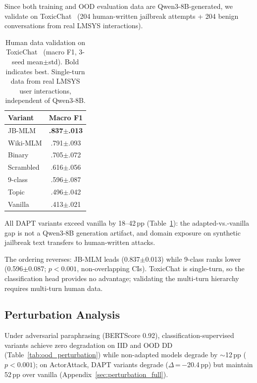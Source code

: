 Since both training and OOD evaluation data are Qwen3-8B-generated, we validate on ToxicChat~\citep{lin2023toxicchat} (204 human-written jailbreak attempts + 204 benign conversations from real LMSYS interactions).

\begin{table}[t]
\centering
\small
\caption{Human data validation on ToxicChat~\citep{lin2023toxicchat} (macro F1, 3-seed mean$\pm$std). Bold indicates best. Single-turn data from real LMSYS user interactions, independent of Qwen3-8B.}
\label{tab:human_data}
\begin{tabular}{@{}lc@{}}
\toprule
\textbf{Variant} & Macro F1 \\
\midrule
JB-MLM & \textbf{.837$\pm$.013} \\
Wiki-MLM & .791$\pm$.093 \\
Binary & .705$\pm$.072 \\
Scrambled & .616$\pm$.056 \\
9-class & .596$\pm$.087 \\
Topic & .496$\pm$.042 \\
\midrule
Vanilla & .413$\pm$.021 \\
\bottomrule
\end{tabular}
\end{table}

All DAPT variants exceed vanilla by 18--42\,pp (Table~\ref{tab:human_data}): the adapted-vs.-vanilla gap is not a Qwen3-8B generation artifact, and domain exposure on synthetic jailbreak text transfers to human-written attacks.

The ordering reverses: JB-MLM leads (0.837$\pm$0.013) while 9-class ranks lower (0.596$\pm$0.087; $p < 0.001$, non-overlapping CIs). ToxicChat is single-turn, so the classification head provides no advantage; validating the multi-turn hierarchy requires multi-turn human data.

\subsection{Perturbation Analysis}
\label{sec:perturbation}

Under adversarial paraphrasing (BERTScore 0.92), classification-supervised variants achieve zero degradation on IID and OOD DD (Table~\ref{tab:ood_perturbation}) while non-adapted models degrade by $\sim$12\,pp ($p < 0.001$); on ActorAttack, DAPT variants degrade ($\Delta$\,=\,$-$20.4\,pp) but maintain 52\,pp over vanilla (Appendix~\ref{sec:perturbation_full}).

